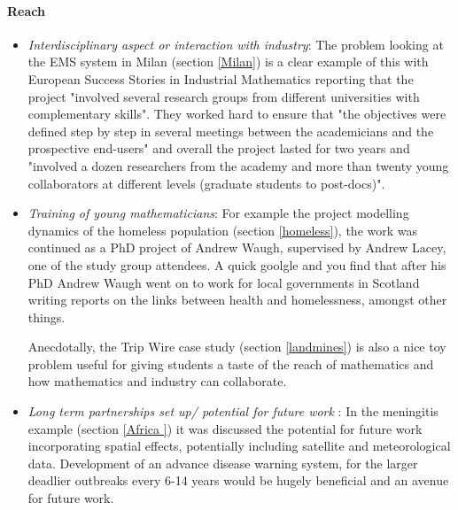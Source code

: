 \documentclass[11pt]{article} %
\begin{document}
\paragraph{Reach}
\begin{itemize}
	\item \textit{Interdisciplinary aspect or interaction with industry}: The problem looking at the EMS system in Milan (section \ref{Milan}) is a clear example of this with European Success Stories in Industrial Mathematics \cite{European2011} reporting that the project "involved several research groups from different universities with complementary skills". They worked hard to ensure that "the objectives were defined step by step in several meetings between the academicians and the prospective end-users" and overall the project lasted for two years and "involved a dozen researchers from the academy and more than twenty young collaborators at different levels (graduate students to post-docs)".
	\item \textit{Training of young mathematicians}: For example the project modelling dynamics of the homeless population (section \ref{homeless}), the work was continued as a PhD project of Andrew Waugh, supervised by Andrew Lacey, one of the study group attendees. A quick goolgle and you find that after his PhD Andrew Waugh went on to work for local governments in Scotland writing reports on the links between health and homelessness, amongst other things.
	
	Anecdotally, the Trip Wire case study (section \ref{landmines}) is also a nice toy problem useful for giving students a taste of the reach of mathematics and how mathematics and industry can collaborate. 
	\item \textit{Long term partnerships set up/ potential for future work }: In the meningitis example (section \ref{Africa }) it was discussed the potential for future work incorporating  spatial effects, potentially including satellite and meteorological data. Development of an advance disease warning system, for the larger deadlier outbreaks every 6-14 years would be hugely beneficial and an avenue for future work. 
\end{itemize}
	 
\end{document}
